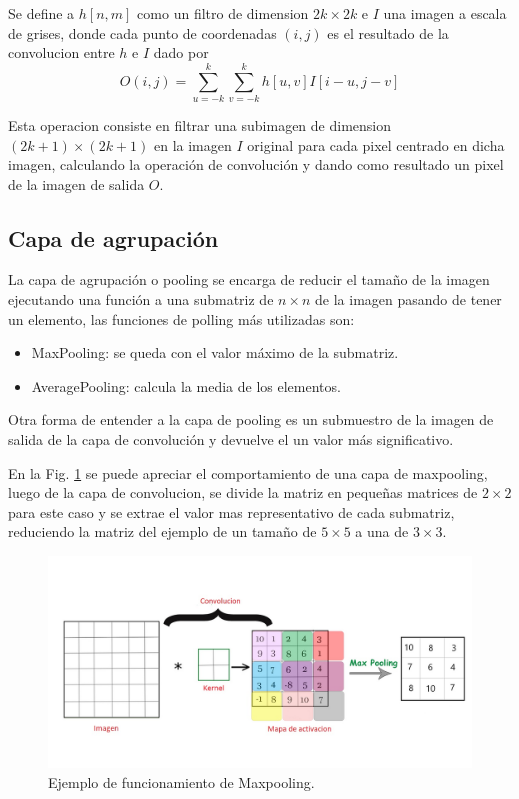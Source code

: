 Se define a $h[n,m]$ como un filtro de dimension $2k \times 2k$ e $I$ una imagen a escala de grises, donde cada punto de coordenadas $(i,j)$ es el
resultado de la convolucion entre $h$ e $I$ dado por
\begin{equation}
    O(i,j)= \sum_{u=-k}^{k} \sum_{v=-k}^{k} h[u,v]I[i-u,j-v]
\end{equation}

Esta operacion consiste en filtrar una subimagen de dimension $(2k+1)\times(2k+1)$ en la imagen $I$ original para cada pixel centrado en dicha imagen, calculando la operación de convolución y dando como resultado un pixel de la imagen de salida $O$.

\subsection{Capa de agrupación}

La capa de agrupación o pooling se encarga de reducir el tamaño de la imagen ejecutando una función a una submatriz de $n \times n$ de la imagen pasando de tener un elemento, las funciones de polling más utilizadas son:

\begin{itemize}
    \item MaxPooling: se queda con el valor máximo de la submatriz.
    \item AveragePooling: calcula la media de los elementos.
\end{itemize}

Otra forma de entender a la capa de pooling es un submuestro de la imagen de salida de la capa de convolución y devuelve el un valor más significativo.

En la Fig. \ref{fig:ejemplo-mp} se puede apreciar el comportamiento de una capa de maxpooling, luego de la capa de convolucion, se divide la matriz
en pequeñas matrices de $2 \times 2$ para este caso y se extrae el valor mas representativo de cada submatriz, reduciendo la matriz del ejemplo de un tamaño de
$5 \times 5$ a una de $3 \times 3$.
\begin{figure}
    \centering
    \includegraphics[width=1\textwidth]{imgs/ej-maxpooling.jpg}
    \caption{Ejemplo de funcionamiento de Maxpooling.}
    \label{fig:ejemplo-mp}
\end{figure}

